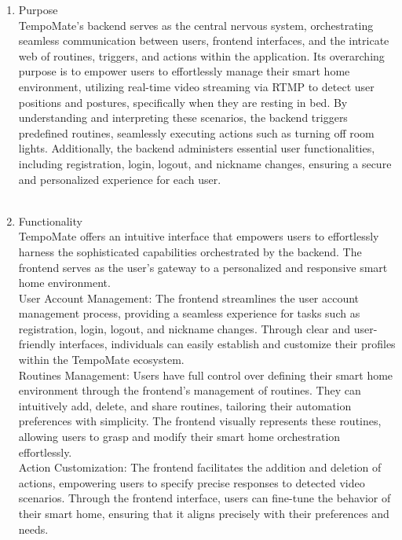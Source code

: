 \begin{enumerate}
                        \item Purpose \\
                              TempoMate's backend serves as the central nervous system, orchestrating seamless communication between users, frontend interfaces, and the intricate web of routines, triggers, and actions within the application. Its overarching purpose is to empower users to effortlessly manage their smart home environment, utilizing real-time video streaming via RTMP to detect user positions and postures, specifically when they are resting in bed. By understanding and interpreting these scenarios, the backend triggers predefined routines, seamlessly executing actions such as turning off room lights. Additionally, the backend administers essential user functionalities, including registration, login, logout, and nickname changes, ensuring a secure and personalized experience for each user. \\\\
                        \item Functionality \\
                              TempoMate offers an intuitive interface that empowers users to effortlessly harness the sophisticated capabilities orchestrated by the backend. The frontend serves as the user's gateway to a personalized and responsive smart home environment.\\

                              User Account Management:
                              The frontend streamlines the user account management process, providing a seamless experience for tasks such as registration, login, logout, and nickname changes. Through clear and user-friendly interfaces, individuals can easily establish and customize their profiles within the TempoMate ecosystem.\\

                              Routines Management:
                              Users have full control over defining their smart home environment through the frontend's management of routines. They can intuitively add, delete, and share routines, tailoring their automation preferences with simplicity. The frontend visually represents these routines, allowing users to grasp and modify their smart home orchestration effortlessly.\\

                              Action Customization:
                              The frontend facilitates the addition and deletion of actions, empowering users to specify precise responses to detected video scenarios. Through the frontend interface, users can fine-tune the behavior of their smart home, ensuring that it aligns precisely with their preferences and needs.\\


\end{enumerate}
